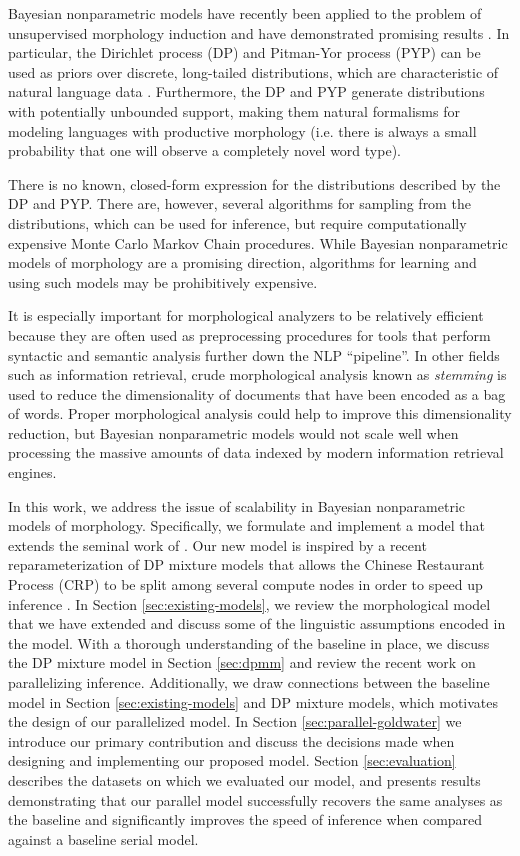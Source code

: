 Bayesian nonparametric models have recently been applied to the
problem of unsupervised morphology induction and have demonstrated
promising results \cite{goldwater2011,dreyer2011,lee2011}. In
particular, the Dirichlet process (DP) and Pitman-Yor process (PYP)
can be used as priors over discrete, long-tailed distributions, which
are characteristic of natural language data
\cite{goldwater2011}. Furthermore, the DP and PYP generate
distributions with potentially unbounded support, making them natural
formalisms for modeling languages with productive morphology
(i.e. there is always a small probability that one will observe a
completely novel word type).

There is no known, closed-form expression for the distributions
described by the DP and PYP. There are, however, several algorithms
for sampling from the distributions, which can be used for inference,
but require computationally expensive Monte Carlo Markov Chain
procedures. While Bayesian nonparametric models of morphology are a
promising direction, algorithms for learning and using such models may
be prohibitively expensive.

It is especially important for morphological analyzers to be
relatively efficient because they are often used as preprocessing
procedures for tools that perform syntactic and semantic analysis
further down the NLP ``pipeline''. In other fields such as information
retrieval, crude morphological analysis known as \textit{stemming} is
used to reduce the dimensionality of documents that have been encoded
as a bag of words. Proper morphological analysis could help to improve
this dimensionality reduction, but Bayesian nonparametric models would
not scale well when processing the massive amounts of data indexed by
modern information retrieval engines.

In this work, we address the issue of scalability in Bayesian
nonparametric models of morphology. Specifically, we formulate and
implement a model that extends the seminal work of
\cite{goldwater2011}. Our new model is inspired by a recent
reparameterization of DP mixture models that allows the Chinese
Restaurant Process (CRP) to be split among several compute nodes in
order to speed up inference \cite{williamson2013}. In Section
\ref{sec:existing-models}, we review the morphological model that we
have extended and discuss some of the linguistic assumptions encoded
in the model. With a thorough understanding of the baseline in place,
we discuss the DP mixture model in Section \ref{sec:dpmm} and review
the recent work on parallelizing inference. Additionally, we draw
connections between the baseline model in Section
\ref{sec:existing-models} and DP mixture models, which motivates the
design of our parallelized model. In Section
\ref{sec:parallel-goldwater} we introduce our primary contribution and
discuss the decisions made when designing and implementing our
proposed model. Section \ref{sec:evaluation} describes the datasets on
which we evaluated our model, and presents results demonstrating that
our parallel model successfully recovers the same analyses as the
baseline and significantly improves the speed of inference when
compared against a baseline serial model.
